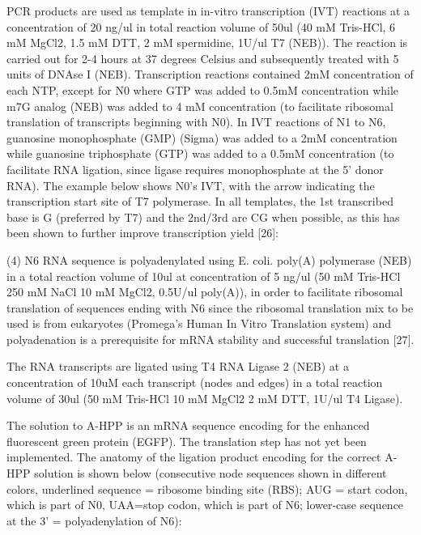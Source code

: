 			PCR products are used as template in in-vitro transcription (IVT) reactions at a concentration of 20 ng/ul in 
			total reaction volume of 50ul (40 mM Tris-HCl, 6 mM MgCl2, 1.5 mM DTT, 2 mM spermidine, 1U/ul T7 (NEB)). The reaction is 
			carried out for 2-4 hours at 37 degrees Celsius and subsequently treated with 5 units of DNAse I (NEB). Transcription 
			reactions contained 2mM concentration of each NTP, except for N0 where GTP was added to 0.5mM concentration while m7G 
			analog (NEB) was added to 4 mM concentration (to facilitate ribosomal translation of transcripts beginning with N0). 
			In IVT reactions of N1 to N6, guanosine monophosphate (GMP) (Sigma) was added to a 2mM concentration while guanosine 
			triphosphate (GTP) was added to a 0.5mM concentration (to facilitate RNA ligation, since ligase requires monophosphate 
			at the 5’ donor RNA). The example below shows N0’s IVT, with the arrow indicating the transcription start site of T7 polymerase. 
			In all templates, the 1st transcribed base is G (preferred by T7) and the 2nd/3rd are CG when possible, as this has been shown 
			to further improve transcription yield [26]: 
		

			(4)	N6 RNA sequence is polyadenylated using E. coli. poly(A) polymerase (NEB) in a total reaction volume of 10ul at 
			concentration of 5 ng/ul (50 mM Tris-HCl 250 mM NaCl 10 mM MgCl2, 0.5U/ul poly(A)), in order to facilitate ribosomal 
			translation of sequences ending with N6 since the ribosomal translation mix to be used is from eukaryotes (Promega’s 
			Human In Vitro Translation system) and polyadenation is a prerequisite for mRNA stability and successful translation [27]. 
			
			The RNA transcripts are ligated using T4 RNA Ligase 2 (NEB) at a concentration of 10uM each transcript (nodes and edges) 
			in a total reaction volume of 30ul (50 mM Tris-HCl 10 mM MgCl2 2 mM DTT, 1U/ul T4 Ligase). 
			
			The solution to A-HPP is an mRNA sequence encoding for the enhanced fluorescent green protein (EGFP). The translation 
			step has not yet been implemented. The anatomy of the ligation product encoding for the correct A-HPP solution is shown 
			below (consecutive node sequences shown in different colors, underlined sequence = ribosome binding site (RBS); AUG = start codon, 
			which is part of N0, UAA=stop codon, which is part of N6; lower-case sequence at the 3’ = polyadenylation of N6):


